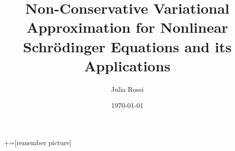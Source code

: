 \documentclass[12 pt]{beamer}
\author[Julia Rossi \quad {SDSU \& CGU}]{Julia Rossi}
\title[NCVA for NLS Equations and its Applications]{Non-Conservative Variational Approximation for Nonlinear Schr\"{o}dinger Equations and its Applications}
\institute{San Diego State University \& Claremont Graduate University}
\date{\today}
\begin{document}

+=[remember picture]





% 	
\end{document}

